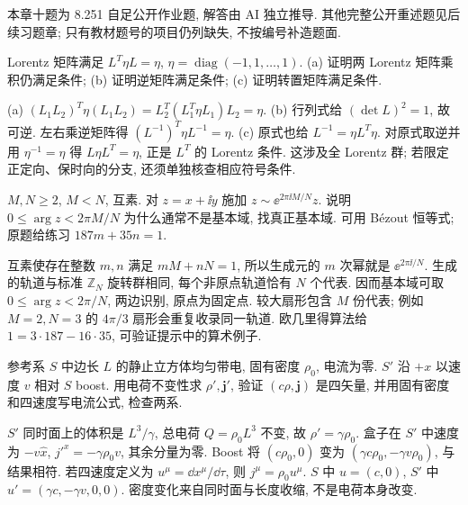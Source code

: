 本章十题为 8.251 自足公开作业题, 解答由 AI 独立推导. 其他完整公开重述题见后续习题章; 只有教材题号的项目仍列缺失, 不按编号补造题面.

\begin{exercise}
Lorentz 矩阵满足 $L^T\eta L=\eta$, $\eta=\operatorname{diag}(-1,1,\ldots,1)$.
(a) 证明两 Lorentz 矩阵乘积仍满足条件; (b) 证明逆矩阵满足条件; (c) 证明转置矩阵满足条件.
\end{exercise}
\begin{solution}
(a) $(L_1L_2)^T\eta(L_1L_2)=L_2^T(L_1^T\eta L_1)L_2=\eta$.
(b) 行列式给 $(\det L)^2=1$, 故可逆. 左右乘逆矩阵得 $(L^{-1})^T\eta L^{-1}=\eta$.
(c) 原式也给 $L^{-1}=\eta L^T\eta$. 对原式取逆并用 $\eta^{-1}=\eta$ 得 $L\eta L^T=\eta$, 正是 $L^T$ 的 Lorentz 条件. 这涉及全 Lorentz 群; 若限定正定向、保时向的分支, 还须单独核查相应符号条件.
\end{solution}

\begin{exercise}
$M,N\ge2$, $M<N$, 互素. 对 $z=x+\ii y$ 施加 $z\sim\ee^{2\pi\ii M/N}z$. 说明 $0\le\arg z<2\pi M/N$ 为什么通常不是基本域, 找真正基本域. 可用 Bézout 恒等式; 原题给练习 $187m+35n=1$.
\end{exercise}
\begin{solution}
互素使存在整数 $m,n$ 满足 $mM+nN=1$, 所以生成元的 $m$ 次幂就是 $\ee^{2\pi\ii/N}$. 生成的轨道与标准 $\mathbb Z_N$ 旋转群相同, 每个非原点轨道恰有 $N$ 个代表. 因而基本域可取 $0\le\arg z<2\pi/N$, 两边识别, 原点为固定点. 较大扇形包含 $M$ 份代表; 例如 $M=2,N=3$ 的 $4\pi/3$ 扇形会重复收录同一轨道. 欧几里得算法给 $1=3\cdot187-16\cdot35$, 可验证提示中的算术例子.
\end{solution}

\begin{exercise}
参考系 $S$ 中边长 $L$ 的静止立方体均匀带电, 固有密度 $\rho_0$, 电流为零. $S'$ 沿 $+x$ 以速度 $v$ 相对 $S$ boost.
用电荷不变性求 $\rho',\boldsymbol j'$, 验证 $(c\rho,\boldsymbol j)$ 是四矢量, 并用固有密度和四速度写电流公式, 检查两系.
\end{exercise}
\begin{solution}
$S'$ 同时面上的体积是 $L^3/\gamma$, 总电荷 $Q=\rho_0L^3$ 不变, 故 $\rho'=\gamma\rho_0$. 盒子在 $S'$ 中速度为 $-v\hat x$, $j'^x=-\gamma\rho_0v$, 其余分量为零. Boost 将 $(c\rho_0,0)$ 变为 $(\gamma c\rho_0,-\gamma v\rho_0)$, 与结果相符. 若四速度定义为 $u^\mu=\dd x^\mu/\dd\tau$, 则 $j^\mu=\rho_0u^\mu$. $S$ 中 $u=(c,0)$, $S'$ 中 $u'=(\gamma c,-\gamma v,0,0)$. 密度变化来自同时面与长度收缩, 不是电荷本身改变.
\end{solution}

